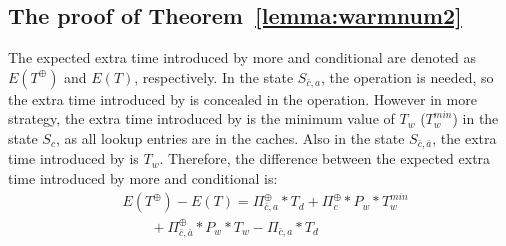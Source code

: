 \subsection{The proof of Theorem~\ref{lemma:warmnum2}}
The expected extra time introduced by more {\vwarm} and conditional {\vwarm}  are denoted as $E(T^{\oplus})$ and $E(T)$, respectively.
In the state $S_{\bar{c}, a}$, the {\vdelay} operation is needed,
so the extra time introduced by {\vwarm} is concealed in the {\vdelay} operation.
 However in more {\vwarm} strategy,
the extra time introduced by {\vwarm} is the minimum value of $T_{w}$ ($T_{w}^{min}$) in the state $S_{c}$, as all lookup entries are in the caches.
  Also in the state $S_{\bar{c}, \bar{a}}$, the extra time introduced by {\vwarm} is $T_{w}$.
Therefore, the difference between the expected extra time introduced by more {\vwarm} and conditional {\vwarm} is:
\begin{align}
&E(T^{\oplus})-E(T)=\Pi_{\bar{c}, a}^{\oplus} * T_{d} + \Pi_{c}^{\oplus}*P_{w}*T_{w}^{min} \nonumber \\
 &\ \ \ \ \ \ \ \ \ + \Pi_{\bar{c}, \bar{a}}^{\oplus}*P_{w}*T_{w} - \Pi_{\bar{c}, a} * T_{d}
\end{align}

